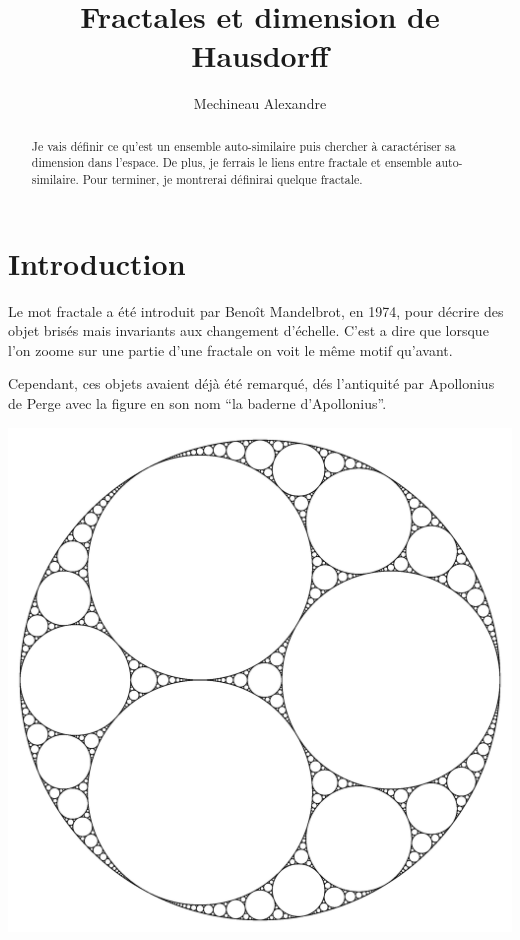 \documentclass[a4paper, 12pt]{report}
\title{ \bf Fractales et dimension de Hausdorff}
\author{Mechineau Alexandre}
\begin{document}
	\newtheorem{definition}{Définition}
	\newtheorem{prop}{Proposition}
	\newtheorem{theorem}{Théorème}
	\newtheorem*{remark*}{Remarque}
	\newtheorem{lemma}{Lemme}
	
	
	\maketitle
	
	\begin{abstract}
		Je vais définir ce qu'est un ensemble auto-similaire puis chercher à caractériser sa dimension dans l'espace. De plus, je ferrais le liens entre fractale et ensemble auto-similaire. Pour terminer, je montrerai définirai quelque fractale.
	\end{abstract}
	
	\tableofcontents
	
	\chapter{\bf Introduction}
		
		Le mot fractale a été introduit par Benoît Mandelbrot, en 1974, pour décrire des objet brisés mais invariants aux changement d'échelle. C'est a dire que lorsque l'on zoome sur une partie d'une fractale on voit le même motif qu'avant.
		
		Cependant, ces objets avaient déjà été remarqué, dés l'antiquité par Apollonius de Perge avec la figure en son nom ``la baderne d'Apollonius''.
		\begin{center}
			\includegraphics[scale=0.1]{Images/baderne}
		\end{center}
		
\end{document}

